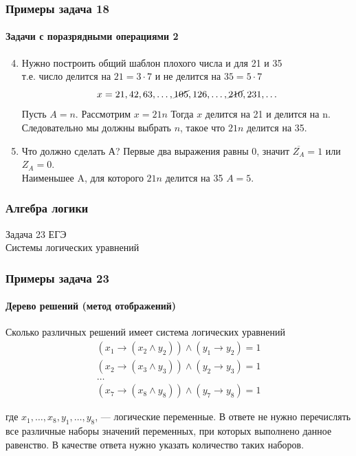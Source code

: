 \begin{frame}[t]
\frametitle{Примеры задача 18}
\framesubtitle{Задачи с поразрядными операциями 2}

	\begin{enumerate}
	\setcounter{enumi}{3}
		\item 
				
		Нужно построить общий шаблон плохого числа и для 21 и 35\\
		т.е. число делится на $21=3\cdot 7$ и не делится на $35=5\cdot 7$\\ 	\pause 
		$$ 
		x=21,42,63,\ldots,\cancel{105},126,\ldots,\cancel{210},231,\ldots
		$$ 	\pause 
	  Пусть $A=n$. Рассмотрим $x=21n$ Тогда $x$ делится на 21 и делится на n.\\
		Следовательно мы должны выбрать $n$, такое что $21n$ делится на 35.
		\pause 
		\item Что должно сделать А? Первые два выражения равны 0, значит $\overline{Z_A}=1$ или
		$Z_A=0$.\\ 	\pause 
		Наименьшее A, для которого $21n$ делится на 35 $A=5$.
					
	\end{enumerate}
	
	
\end{frame}


\begin{frame}
\frametitle{Алгебра логики}

\begin{center}

\Huge
Задача 23 ЕГЭ\\
Системы логических уравнений
	
\end{center}


\end{frame}

\begin{frame}[t]
\frametitle{Примеры задача 23}
\framesubtitle{Дерево решений (метод отображений)}
Сколько различных решений имеет система логических уравнений 
\begin{align*}
(x_1 \rightarrow (x_2 \wedge y_2)) \wedge (y_1 \rightarrow y_2) = 1\\
(x_2 \rightarrow (x_3 \wedge y_3)) \wedge (y_2 \rightarrow y_3) = 1\\
\ldots \\
(x_7 \rightarrow (x_8 \wedge y_8)) \wedge (y_7 \rightarrow y_8) = 1
\end{align*}


где $x_1, \ldots, x_8, y_1, \ldots, y_8$, --- логические переменные. В ответе не нужно перечислять все различные наборы значений переменных, при которых выполнено данное равенство. В качестве ответа нужно указать количество таких наборов.

	
\end{frame}

